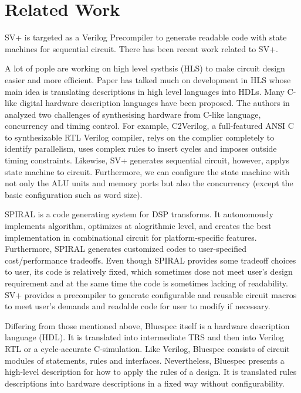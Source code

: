 \section{Related Work}\label{sec:relatedwork}
SV+ is targeted as a Verilog Precompiler to generate readable code with state machines for sequential circuit.
There has been recent work related to SV+.

A lot of pople are working on high level systhsis (HLS)\cite{HLS:intro}\cite{ChipDesign:HLS}\cite{SPARK} to make circuit design easier and more efficient. Paper\cite{Survey:HLS} has talked much on development in HLS whose main idea is translating descriptions in high level languages into HDLs.  
Many C-like digital hardware description languages have been proposed. The authors in\cite{HLSofDigitalSystems} analyzed two challenges of synthesising hardware from C-like language, concurrency and timing control. For example, C2Verilog\cite{C2Verilog}, a full-featured ANSI C to synthesizable RTL Verilog compiler, relys on the complier completely to identify parallelism, uses complex rules to insert cycles and imposes outside timing constraints. Likewise, SV+ generates sequential circuit, however, applys state machine to circuit. Furthermore, we can configure the state machine with not only the ALU units and memory ports but also the concurrency (except the basic configuration such as word size).

SPIRAL\cite{CodeG:Spiral}\cite{SpiralProject} is a code generating system for DSP transforms. It autonomously implements algorithm, optimizes at alogrithmic level, and creates the best implementation in combinational circuit for platform-specific features. Furthermore, SPIRAL generates customized codes to user-specified cost/performance tradeoffs. Even though SPIRAL provides some tradeoff choices to user, its code is relatively fixed, which sometimes dose not meet user's design requirement and at the same time the code is sometimes lacking of readability. SV+ provides a precompiler to generate configurable and reusable circuit macros to meet user's demands and readable code for user to modify if necessary.

Differing from those mentioned above, Bluespec itself is a hardware description language (HDL). It is translated into intermediate TRS and then into Verilog RTL or a cycle-accurate C-simulation. Like Verilog, Bluespec consists of circuit modules of statements, rules and interfaces. Nevertheless, Bluespec presents a high-level description for how to apply the rules of a design. It is translated rules descriptions into hardware descriptions in a fixed way without configurability.



